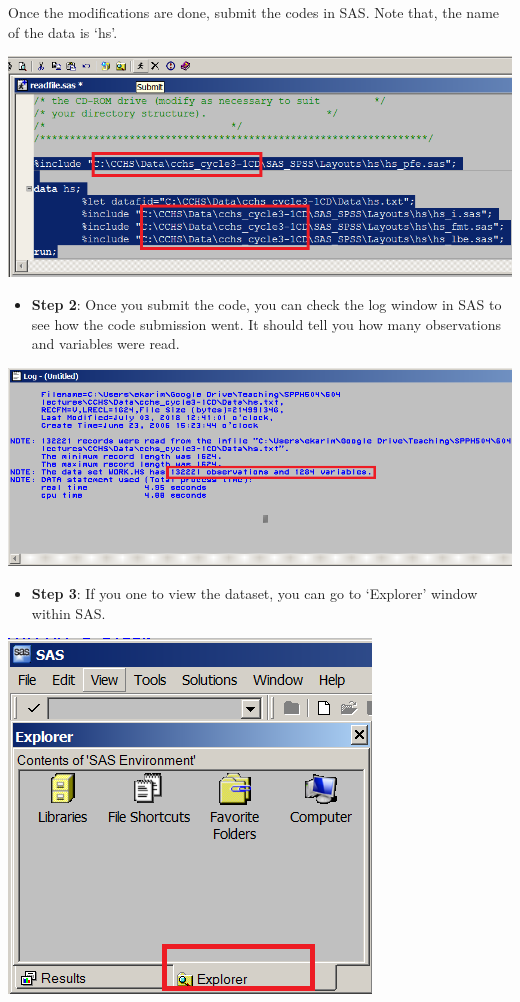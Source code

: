 \documentclass[
]{book}
\providecommand{\tightlist}{%
  \setlength{\itemsep}{0pt}\setlength{\parskip}{0pt}}
\begin{document}
Once the modifications are done, submit the codes in SAS. Note that, the name of the data is `hs'.

\includegraphics[width=0.65\linewidth]{images/abacus14}

\begin{itemize}
\tightlist
\item
  \textbf{Step 2}: Once you submit the code, you can check the log window in SAS to see how the code submission went. It should tell you how many observations and variables were read.
\end{itemize}

\includegraphics[width=0.65\linewidth]{images/abacus15}

\begin{itemize}
\tightlist
\item
  \textbf{Step 3}: If you one to view the dataset, you can go to `Explorer' window within SAS.
\end{itemize}

\includegraphics[width=0.65\linewidth]{images/abacus16}
\end{document}
